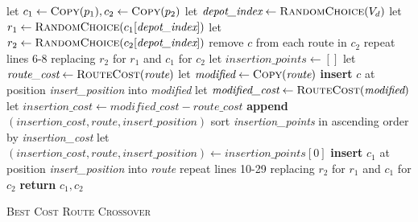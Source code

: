 \documentclass[paper=a4, fontsize=10pt]{scrartcl}
\begin{document}
\begin{multicols}{2}
{
\begin{minipage}{\linewidth-4mm}
\begin{algorithm}[H]
\footnotesize
\begin{algorithmic}[1]
    \State let $c_1 \gets \textsc{Copy}(p_1), c_2 \gets \textsc{Copy}(p_2)$
    \State let $\textit{depot\_index} \gets \textsc{RandomChoice}(V_d)$
    \State let $r_1 \gets \textsc{RandomChoice}(c_1[\textit{depot\_index}])$
    \State let $r_2 \gets \textsc{RandomChoice}(c_2[\textit{depot\_index}])$
        \State remove $c$ from each route in $c_2$
    \EndFor
    \State repeat lines 6-8 replacing $r_2$ for $r_1$ and $c_1$ for $c_2$
        \State let $\textit{insertion\_points} \gets []$
                \State let $\textit{route\_cost} \gets \textsc{RouteCost}(\textit{route})$
                    \State let $\textit{modified} \gets \textsc{Copy}(\textit{route})$
                    \State \textbf{insert} $c$ at position \textit{insert\_position} into \textit{modified}
                    \State let $\textit{modified\_cost} \gets \textsc{RouteCost}(\textit{modified})$
                        \State let $\textit{insertion\_cost} \gets \textit{modified\_cost} - \textit{route\_cost}$
                        \State \textbf{append} $(\textit{insertion\_cost}, \textit{route}, \textit{insert\_position})$
                    \EndIf
                \EndFor
            \EndFor
        \EndFor
        \State sort \textit{insertion\_points} in ascending order by \textit{insertion\_cost}
        \State let $(\textit{insertion\_cost}, \textit{route}, \textit{insert\_position}) \gets \textit{insertion\_points}[0]$
        \State \textbf{insert} $c_1$ at position \textit{insert\_position} into \textit{route}
    \EndFor
    \State repeat lines 10-29 replacing $r_2$ for $r_1$ and $c_1$ for $c_2$
    \State \textbf{return} $c_1, c_2$
\EndFunction
\end{algorithmic}
\caption{\textsc{Best Cost Route Crossover}}
\label{alg:bcrc}
\end{algorithm}
\end{minipage}
}


\end{multicols}
\end{document}
